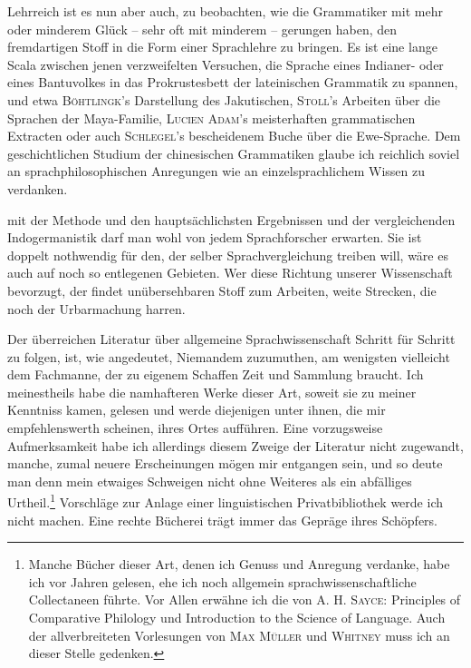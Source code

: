 \label{sp.52}

Lehrreich ist es nun aber auch, zu beobachten, wie die Grammatiker mit mehr oder minderem Glück – sehr oft mit minderem – gerungen haben, den fremdartigen Stoff in die Form einer Sprachlehre zu bringen. Es ist eine lange Scala zwischen jenen verzweifelten Versuchen, die Sprache eines Indianer- oder eines Bantuvolkes in das Prokrustesbett der lateinischen Grammatik zu spannen, und etwa \textsc{Böhtlingk}’s Darstellung des Jakutischen, \textsc{Stoll}’s Arbeiten über die Sprachen der Maya-Familie, \textsc{Lucien Adam}’s meisterhaften grammatischen Extracten oder auch \textsc{Schlegel}’s bescheidenem Buche über die Ewe-Sprache. Dem geschichtlichen Studium der chinesischen Grammatiken glaube ich reichlich soviel an sprachphilosophischen Anregungen wie an einzelsprachlichem Wissen zu verdanken.

\largerpage[1] mit der Methode und den hauptsächlichsten Ergebnissen und  der vergleichenden Indogermanistik darf man wohl von jedem Sprachforscher erwarten. Sie ist doppelt nothwendig für den, der selber Sprachvergleichung treiben will, wäre es auch auf noch so entlegenen Gebieten. Wer diese Richtung unserer Wissenschaft bevorzugt, der findet unübersehbaren Stoff zum Arbeiten, weite Strecken, die noch der Urbarmachung harren.

Der überreichen Literatur über allgemeine Sprachwissenschaft Schritt für Schritt zu folgen, ist, wie angedeutet, Niemandem zuzumuthen, am wenigsten vielleicht dem Fachmanne, der zu eigenem Schaffen Zeit und Sammlung braucht. Ich meinestheils habe die namhafteren Werke dieser Art, soweit sie zu meiner Kenntniss kamen, gelesen und werde diejenigen unter ihnen, die mir empfehlenswerth scheinen, ihres Ortes aufführen. Eine vorzugsweise Aufmerksamkeit habe ich allerdings diesem Zweige der Literatur nicht zugewandt, manche, zumal neuere Erscheinungen mögen mir entgangen sein, und so deute man denn mein etwaiges \label{fp.53} Schweigen nicht ohne Weiteres als ein abfälliges Urtheil.\footnote{Manche Bücher dieser Art, denen ich Genuss und Anregung verdanke, habe ich vor Jahren gelesen, ehe ich noch allgemein sprachwissenschaftliche Collectaneen führte. Vor Allen erwähne ich die von \textsc{A. H. Sayce}: Principles of Comparative Philology und Introduction to the Science of Language. Auch der allverbreiteten Vorlesungen von \textsc{Max Müller} und \textsc{Whitney} muss ich an dieser Stelle gedenken. } Vorschläge zur Anlage einer linguistischen Privatbibliothek werde ich nicht machen. Eine rechte Bücherei trägt immer das Gepräge ihres Schöpfers.

